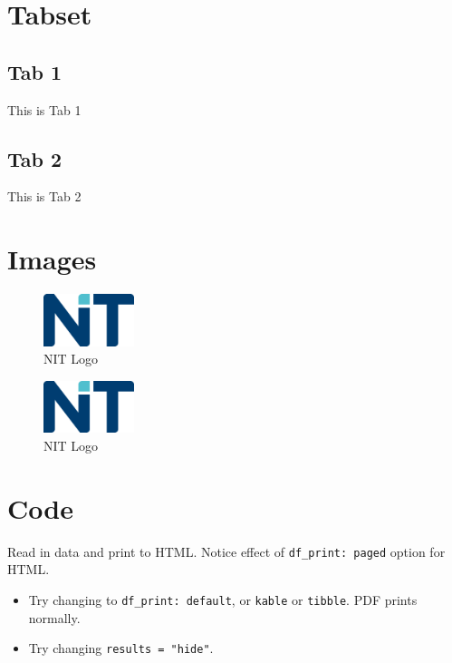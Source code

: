 \documentclass[
]{article}
\begin{document}
\hypertarget{tabset}{%
\section{Tabset}\label{tabset}}

\hypertarget{tab-1}{%
\subsection{Tab 1}\label{tab-1}}

This is Tab 1

\hypertarget{tab-2}{%
\subsection{Tab 2}\label{tab-2}}

This is Tab 2

\hypertarget{images}{%
\section{Images}\label{images}}

\begin{figure}
\centering
\includegraphics[width=1.04167in,height=\textheight]{img/logo_nit.png}
\caption{NIT Logo}
\end{figure}

\begin{figure}

{\centering \includegraphics[width=100px]{img/logo_nit} 

}

\caption{NIT Logo}\label{fig:unnamed-chunk-3}
\end{figure}

\hypertarget{code}{%
\section{Code}\label{code}}

Read in data and print to HTML. Notice effect of
\texttt{df\_print:\ paged} option for HTML.

\begin{itemize}
\item
  Try changing to \texttt{df\_print:\ default}, or \texttt{kable} or
  \texttt{tibble}. PDF prints normally.
\item
  Try changing \texttt{results\ =\ "hide"}.
\end{itemize}
\end{document}
